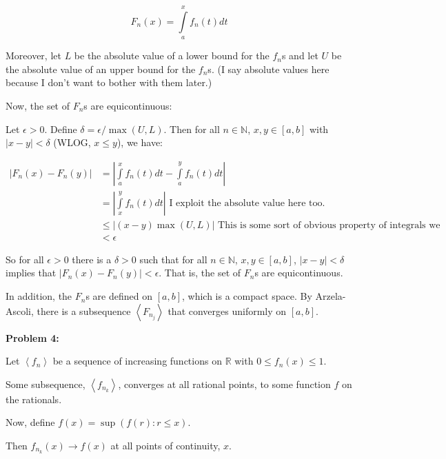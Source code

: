 \documentclass[a4paper,12pt]{article}
\newcommand{\tab}{\hspace{4mm}} %
\newcommand{\shunt}{\vspace{20mm}}
\newcommand{\absval}[1]{\left\lvert #1 \right\rvert}
\newcommand{\anbrack}[1]{\left\langle #1 \right\rangle}
\newcommand{\de}{\delta}
\newcommand{\ep}{\epsilon}
\newcommand{\N}{\mathbb{N}}
\newcommand{\R}{\mathbb{R}}
\begin{document}
\begin{displaymath}
F_n(x) = \int\limits_a^x f_n(t)dt
\end{displaymath}

Moreover, let $L$ be the absolute value of a lower bound for the $f_n$s and let $U$ be the absolute value of an upper bound for the $f_n$s. (I say absolute values here because I don't want to bother with them later.)

Now, the set of $F_n$s are equicontinuous:

\tab Let $\ep >0$. Define $\de = \ep /\max(U,L)$. Then for all $n \in \N$, $x, y \in [a,b]$ with $\absval{x-y} < \de$ (WLOG, $x \leq y$), we have:

\begin{align*}
\absval{F_n(x)-F_n(y)} &= \absval{\int\limits_a^x f_n(t)dt - \int\limits_a^y f_n(t)dt} \\
&= \absval{\int\limits_x^y f_n(t)dt} \text{ I exploit the absolute value here too.} \\
&\leq \absval{(x-y)\max(U,L)} \text{ This is some sort of obvious property of integrals we should know} \\
&< \ep
\end{align*}

\tab So for all $\ep>0$ there is a $\de >0$ such that for all $n \in \N$, $x,y \in [a,b]$, $\absval{x-y} < \de$ implies that $\absval{F_n(x)-F_n(y)} < \ep$. That is, the set of $F_n$s are equicontinuous.

In addition, the $F_n$s are defined on $[a,b]$, which is a compact space. By Arzela-Ascoli, there is a subsequence $\anbrack{F_{n_j}}$ that converges uniformly on $[a,b]$.

\shunt

{\bf Problem 4:}

Let $\anbrack{f_n}$ be a sequence of increasing functions on $\R$ with $0 \leq f_n(x) \leq 1$. 

Some subsequence, $\anbrack{f_{n_k}}$, converges at all rational points, to some function $f$ on the rationals.

\tab %

Now, define $f(x) = \sup(f(r): r \leq x)$.

Then $f_{n_k}(x) \to f(x)$ at all points of continuity, $x$.
\end{document}
